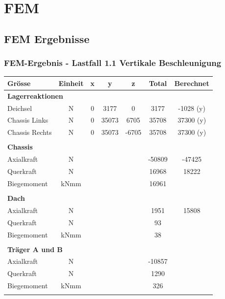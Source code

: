 \section{FEM}

\subsection{FEM Ergebnisse}
  \label{FEM Ergebnisse}

  \subsubsection{FEM-Ergebnis - Lastfall 1.1 Vertikale Beschleunigung}
  \begin{table}[H]
  \centering
  \begin{tabular}{lcccccc}
  Grösse	&	Einheit	&	x	&	y	&	z	&	Total	&	Berechnet	\\	\hline
  \multicolumn{5}{l}{\textbf{Lagerreaktionen}}									&		&		\\	\thickhline
  Deichsel	&	N	&	0	&	3177	&	0	&	3177	&	-1028 (y)	\\
  Chassis Links	&	N	&	0	&	35073	&	6705	&	35708	&	37300 (y)	\\
  Chassis Rechts	&	N	&	0	&	35073	&	-6705	&	35708	&	37300 (y)	\\	\hline	\\
  \multicolumn{5}{l}{\textbf{Chassis}}									&		&		\\	\thickhline
  Axialkraft	&	N	&		&		&		&	-50809	&	-47425	\\
  Querkraft	&	N	&		&		&		&	16968	&	18222	\footnotemark \\
  Biegemoment	&	kNmm	&		&		&		&	16961	&		\\	\hline	\\
  \multicolumn{5}{l}{\textbf{Dach}}									&		&		\\	\thickhline
  Axialkraft	&	N	&		&		&		&	1951	&	15808	\\
  Querkraft	&	N	&		&		&		&	93	&		\\
  Biegemoment	&	kNmm	&		&		&		&	38	&		\\	\hline	\\
  \multicolumn{5}{l}{\textbf{Träger A und B}}													\\	\thickhline
  Axialkraft	&	N	&		&		&		&	-10857	&		\\
  Querkraft	&	N	&		&		&		&	1290	&		\\
  Biegemoment	&	kNmm	&		&		&		&	326	&		\\	\hline	\\

\end{tabular}
\end{table}
